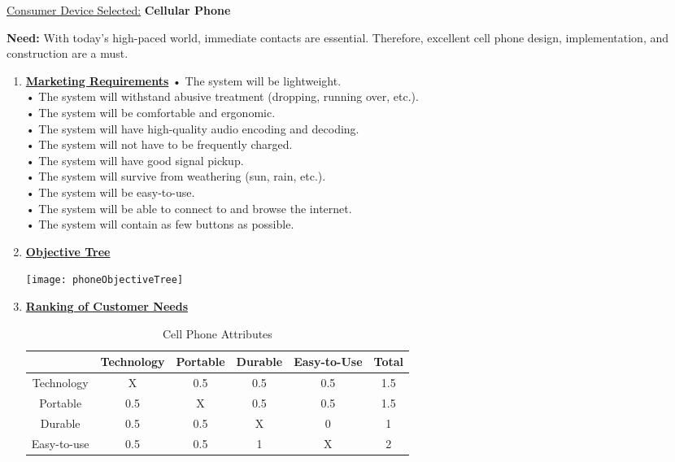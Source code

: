\begin{enumerate}
\begin{onlysolution}
  \underline{Consumer Device Selected:} \textbf{Cellular Phone}
  
  \textbf{Need:} With today’s high-paced world, immediate contacts are essential. Therefore,
  excellent cell phone design, implementation, and construction are a must.
  \begin{enumerate}
  \def\labelenumi{\arabic{enumi}.}
    \item \underline{\textbf{Marketing Requirements}}
• The system will be lightweight.\\
• The system will withstand abusive treatment (dropping, running over, etc.).\\
• The system will be comfortable and ergonomic.\\
• The system will have high-quality audio encoding and decoding.\\
• The system will not have to be frequently charged.\\
• The system will have good signal pickup.\\
• The system will survive from weathering (sun, rain, etc.).\\
• The system will be easy-to-use.\\
• The system will be able to connect to and browse the internet.\\
• The system will contain as few buttons as possible.

    \item \underline{\textbf{Objective Tree}}

	\texttt{[image: phoneObjectiveTree]}

 
   \item \underline{\textbf{Ranking of Customer Needs}}   
    \begin{table}
    \caption{Cell Phone Attributes}
    \begin{tabular}{c|c|c|c|c|c}
    				& Technology	& Portable	& Durable	& Easy-to-Use 	& Total			\\ \hline    			
	Technology	& X 			& 0.5		& 0.5		& 0.5			& 1.5 			\\ \hline    			
	Portable		& 0.5 			& X			& 0.5		& 0.5			& 1.5	 			\\ \hline    			
	Durable		&  0.5			& 0.5		& X			& 0				& 1 			\\ \hline    			    
	Easy-to-use	&  0.5			& 	0.5		& 1			& 	X			& 2 			\\ \hline    			
	\end{tabular}
	\end{table}



\end{enumerate}
\end{onlysolution}
\end{enumerate}
